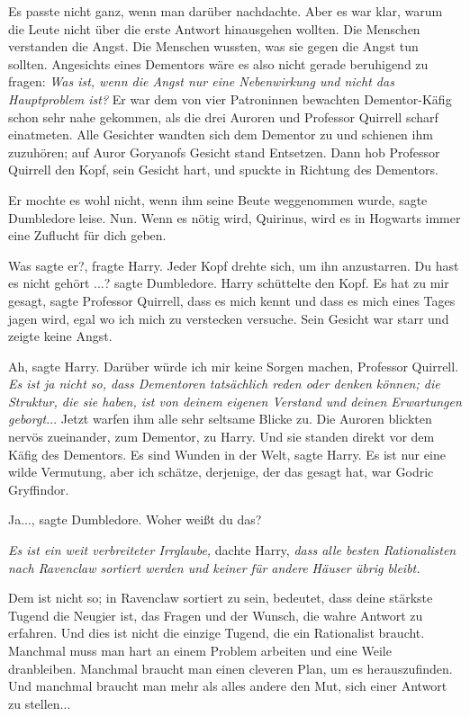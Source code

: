 Es passte nicht ganz, wenn man darüber nachdachte. Aber es war klar, warum die
Leute nicht über die erste Antwort hinausgehen wollten. Die Menschen verstanden
die Angst. Die Menschen wussten, was sie gegen die Angst tun sollten. Angesichts
eines Dementors wäre es also nicht gerade beruhigend zu fragen: \emph{\glqq{}Was
ist, wenn die Angst nur eine Nebenwirkung und nicht das} \emph{Hauptproblem
ist?}\grqq{} Er war dem von vier Patroninnen bewachten Dementor-Käfig schon sehr
nahe gekommen, als die drei Auroren und Professor Quirrell scharf einatmeten.
Alle Gesichter wandten sich dem Dementor zu und schienen ihm zuzuhören; auf
Auror Goryanofs Gesicht stand Entsetzen. Dann hob Professor Quirrell den Kopf,
sein Gesicht hart, und spuckte in Richtung des Dementors.

\glqq{}Er mochte es wohl nicht, wenn ihm seine Beute weggenommen wurde\grqq{},
sagte Dumbledore leise. \glqq{}Nun. Wenn es nötig wird, Quirinus, wird es in
Hogwarts immer eine Zuflucht für dich geben.\grqq{}

\glqq{}Was sagte er?\grqq{}, fragte Harry. Jeder Kopf drehte sich, um ihn
anzustarren. \glqq{}Du hast es nicht gehört ...?\grqq{} sagte Dumbledore. Harry
schüttelte den Kopf. \glqq{}Es hat zu mir gesagt\grqq{}, sagte Professor
Quirrell, \glqq{}dass es mich kennt und dass es mich eines Tages jagen wird, egal
wo ich mich zu verstecken versuche.\grqq{} Sein Gesicht war starr und zeigte keine
Angst.

\glqq{}Ah\grqq{}, sagte Harry. \glqq{}Darüber würde ich mir keine Sorgen machen,
Professor Quirrell.\grqq{} \emph{Es ist ja nicht so, dass Dementoren tatsächlich reden
oder denken können; die Struktur, die sie haben, ist von deinem eigenen Verstand
und deinen Erwartungen geborgt.}.. Jetzt warfen ihm alle sehr seltsame Blicke
zu. Die Auroren blickten nervös zueinander, zum Dementor, zu Harry. Und sie
standen direkt vor dem Käfig des Dementors. \glqq{}Es sind Wunden in der
Welt\grqq{}, sagte Harry. \glqq{}Es ist nur eine wilde Vermutung, aber ich
schätze, derjenige, der das gesagt hat, war Godric Gryffindor.\grqq{}

\glqq{}Ja...\grqq{}, sagte Dumbledore. \glqq{}Woher weißt du das?\grqq{}

\emph{Es ist ein weit verbreiteter Irrglaube,} dachte Harry, \emph{dass alle
besten Rationalisten nach Ravenclaw sortiert werden und keiner für andere Häuser
übrig bleibt.}

Dem ist nicht so; in Ravenclaw sortiert zu sein, bedeutet, dass deine stärkste
Tugend die Neugier ist, das Fragen und der Wunsch, die wahre Antwort zu
erfahren. Und dies ist nicht die einzige Tugend, die ein Rationalist braucht.
Manchmal muss man hart an einem Problem arbeiten und eine Weile dranbleiben.
Manchmal braucht man einen cleveren Plan, um es herauszufinden. Und manchmal
braucht man mehr als alles andere den Mut, sich einer Antwort zu stellen...

